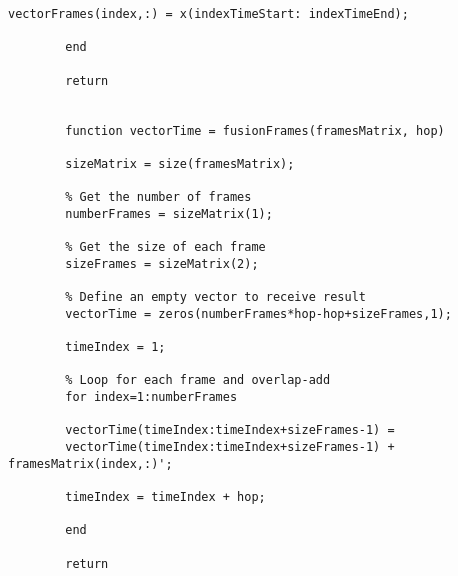 \begin{lstlisting}[caption={Code: "pitchshifting.m":Código Matlab da função auxiliar responsável pelo pitch-shifter},label={codigo02}]
		vectorFrames(index,:) = x(indexTimeStart: indexTimeEnd);
		
		end
		
		return

	
		function vectorTime = fusionFrames(framesMatrix, hop)
		
		sizeMatrix = size(framesMatrix);
		
		% Get the number of frames
		numberFrames = sizeMatrix(1);
		
		% Get the size of each frame
		sizeFrames = sizeMatrix(2);
		
		% Define an empty vector to receive result
		vectorTime = zeros(numberFrames*hop-hop+sizeFrames,1);
		
		timeIndex = 1;
		
		% Loop for each frame and overlap-add
		for index=1:numberFrames
		
		vectorTime(timeIndex:timeIndex+sizeFrames-1) = 
		vectorTime(timeIndex:timeIndex+sizeFrames-1) + framesMatrix(index,:)';
		
		timeIndex = timeIndex + hop;
		
		end
		
		return
	\end{lstlisting}

